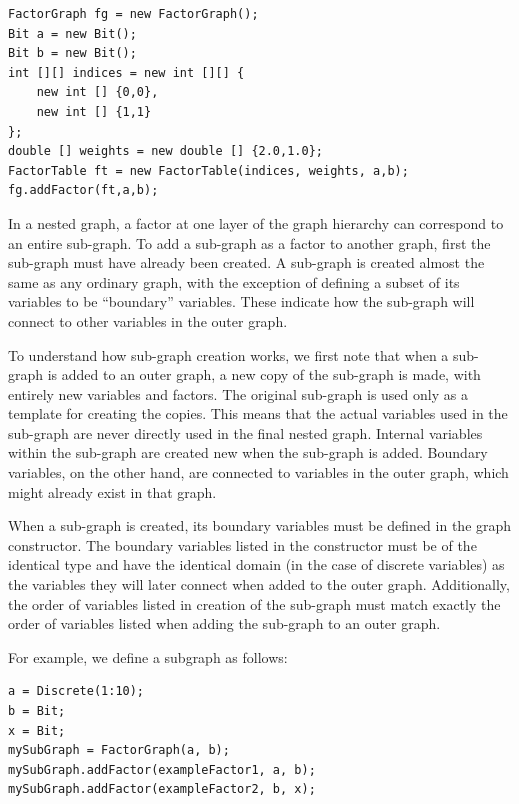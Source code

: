 \fi

\ifjava
\begin{lstlisting}
FactorGraph fg = new FactorGraph();
Bit a = new Bit();
Bit b = new Bit();
int [][] indices = new int [][] {
	new int [] {0,0},
	new int [] {1,1}
};
double [] weights = new double [] {2.0,1.0};
FactorTable ft = new FactorTable(indices, weights, a,b);
fg.addFactor(ft,a,b);
\end{lstlisting}
\fi
   


\label{sec:usingSubGraphs}

In a nested graph, a factor at one layer of the graph hierarchy can correspond to an entire sub-graph.  To add a sub-graph as a factor to another graph, first the sub-graph must have already been created.  A sub-graph is created almost the same as any ordinary graph, with the exception of defining a subset of its variables to be ``boundary'' variables.  These indicate how the sub-graph will connect to other variables in the outer graph.

To understand how sub-graph creation works, we first note that when a sub-graph is added to an outer graph, a new copy of the sub-graph is made, with entirely new variables and factors.  The original sub-graph is used only as a template for creating the copies.  This means that the actual variables used in the sub-graph are never directly used in the final nested graph.  Internal variables within the sub-graph are created new when the sub-graph is added. Boundary variables, on the other hand, are connected to variables in the outer graph, which might already exist in that graph.

When a sub-graph is created, its boundary variables must be defined in the graph constructor.  The boundary variables listed in the constructor must be of the identical type and have the identical domain (in the case of discrete variables) as the variables they will later connect when added to the outer graph.  Additionally, the order of variables listed in creation of the sub-graph must match exactly the order of variables listed when adding the sub-graph to an outer graph.

For example, we define a subgraph as follows:

\ifmatlab

\begin{lstlisting}
a = Discrete(1:10);
b = Bit;
x = Bit;
mySubGraph = FactorGraph(a, b);
mySubGraph.addFactor(exampleFactor1, a, b);
mySubGraph.addFactor(exampleFactor2, b, x);
\end{lstlisting}

